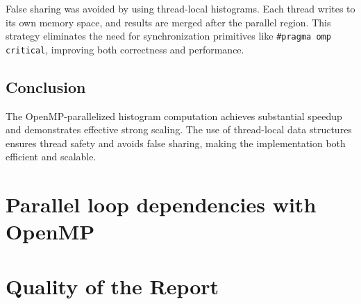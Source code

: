 \documentclass[unicode,11pt,a4paper,oneside,numbers=endperiod,openany]{scrartcl}
\begin{document}
False sharing was avoided by using thread-local histograms. Each thread writes to its own memory space, and results are merged after the parallel region. This strategy eliminates the need for synchronization primitives like \texttt{\#pragma omp critical}, improving both correctness and performance.

\subsection{Conclusion}
The OpenMP-parallelized histogram computation achieves substantial speedup and demonstrates effective strong scaling. The use of thread-local data structures ensures thread safety and avoids false sharing, making the implementation both efficient and scalable.


\newpage
\section{Parallel loop dependencies with OpenMP }


\newpage
\section{Quality of the Report }
\end{document}

